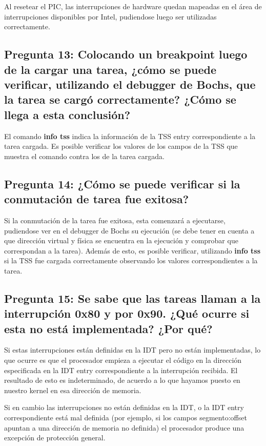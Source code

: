 \documentclass[a4paper,10pt,twoside]{article}
\begin{document}
Al resetear el PIC, las interrupciones de hardware quedan mapeadas en el área de interrupciones disponibles por Intel, pudiendose luego ser utilizadas correctamente.

\subsection{Pregunta 13: Colocando un breakpoint luego de la cargar una tarea, ¿cómo se puede
verificar, utilizando el debugger de Bochs, que la tarea se cargó correctamente? ¿Cómo se
llega a esta conclusión?}
El comando \textbf{info tss} indica la información de la TSS entry correspondiente a la tarea cargada. Es posible verificar los valores de los campos de la TSS que muestra el comando contra los de la tarea cargada. 

\subsection{Pregunta 14: ¿Cómo se puede verificar si la conmutación de tarea fue exitosa?}
Si la conmutación de la tarea fue exitosa, esta comenzará a ejecutarse, pudiendose ver en el debugger de Bochs su ejecución (se debe tener en cuenta a que dirección virtual y física se encuentra en la ejecución y comprobar que correspondan a la tarea). Además de esto, es posible verificar, utilizando \textbf{info tss} si la TSS fue cargada correctamente observando los valores correspondientes a la tarea.


\subsection{Pregunta 15: Se sabe que las tareas llaman a la interrupción 0x80 y por 0x90. ¿Qué ocurre si esta no está implementada? ¿Por qué?}

Si estas interrupciones están definidas en la IDT pero no están implementadas, lo que ocurre es que el procesador empieza a ejecutar el código en la dirección especificada en la IDT entry correspondiente a la interrupción recibida. El resultado de esto es indeterminado, de acuerdo a lo que hayamos puesto en nuestro kernel en esa dirección de memoria.

Si en cambio las interrupciones no están definidas en la IDT, o la IDT entry correspondiente está mal definida (por ejemplo, si los campos segmento:offset apuntan a una dirección de memoria no definida) el procesador produce una excepción de protección general.
\end{document}
